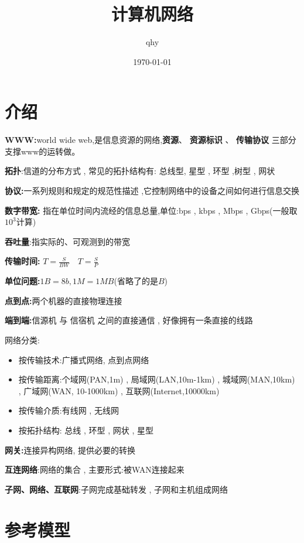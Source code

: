 \documentclass[UTF8,a4paper]{ctexart}
\author{ qhy }
\date{\today}
\title{计算机网络}
\begin{document}
  \maketitle
  \tableofcontents
  \newpage

  \section{介绍}
  \textbf{WWW:}world wide web,是信息资源的网络,\textbf{资源}、 \textbf{资源标识} 、 \textbf{传输协议} 三部分支撑www的运转做。

  \textbf{拓扑}:信道的分布方式 , 常见的拓扑结构有: 总线型, 星型 , 环型 ,树型 , 网状

  \textbf{协议:}一系列规则和规定的规范性描述 ,它控制网络中的设备之间如何进行信息交换

  \textbf{数字带宽:} 指在单位时间内流经的信息总量,单位:bps , kbps , Mbps , Gbps(一般取$10^3$计算)

  \textbf{吞吐量}:指实际的、可观测到的带宽

  \textbf{传输时间:}
  $T = \frac{S}{BW} \quad T = \frac{S}{P}$

  \textbf{单位问题:}$1B = 8b , 1M = 1MB$(省略了的是$B$)

  \textbf{点到点:}两个机器的直接物理连接

  \textbf{端到端:}信源机 与 信宿机 之间的直接通信 , 好像拥有一条直接的线路

  网络分类:
  \begin{itemize}
    \item 按传输技术:广播式网络, 点到点网络
    \item 按传输距离:个域网(PAN,1m) , 局域网(LAN,10m-1km) , 城域网(MAN,10km) , 广域网(WAN, 10-1000km) , 互联网(Internet,10000km)
    \item 按传输介质:有线网 , 无线网
    \item 按拓扑结构: 总线 , 环型 , 网状 , 星型
  \end{itemize}

  \textbf{网关:}连接异构网络, 提供必要的转换

  \textbf{互连网络}:网络的集合 , 主要形式:被WAN连接起来

  \textbf{子网、网络、互联网}:子网完成基础转发 , 子网和主机组成网络

  \section{参考模型}
\end{document}
